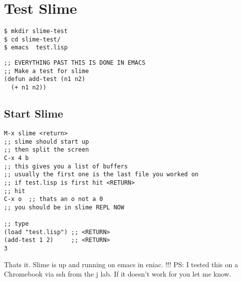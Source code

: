 \documentclass[11pt]{article}
\begin{document}
\section{Test Slime}
\label{sec-4}
\begin{verbatim}
$ mkdir slime-test
$ cd slime-test/
$ emacs  test.lisp
\end{verbatim}


\begin{verbatim}
;; EVERYTHING PAST THIS IS DONE IN EMACS
;; Make a test for slime
(defun add-test (n1 n2)
  (+ n1 n2))
\end{verbatim}
\subsection{Start Slime}
\label{sec-4-1}
\begin{verbatim}
M-x slime <return>
;; slime should start up
;; then split the screen 
C-x 4 b   
;; this gives you a list of buffers
;; usually the first one is the last file you worked on
;; if test.lisp is first hit <RETURN>
;; hit 
C-x o  ;; thats an o not a 0
;; you should be in slime REPL NOW

;; type 
(load "test.lisp") ;; <RETURN>
(add-test 1 2)     ;; <RETURN> 
3
\end{verbatim}
Thats it. Slime is up and running on emacs in eniac. !!!
PS: I tested this on a Chromebook via ssh from the j lab. 
If it doesn't work for you let me know.  
\end{document}
